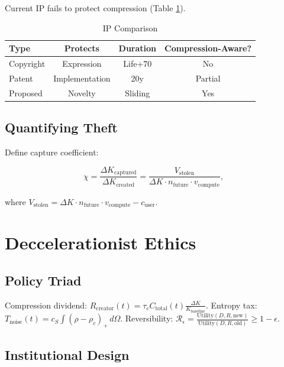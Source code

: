 \documentclass[12pt]{article}
\begin{document}
Current IP fails to protect compression (Table \ref{tab:ip}).

\begin{table}[h]
\caption{IP Comparison}
\begin{center}
\begin{tabular}{lccc}
\toprule
\textbf{Type} & \textbf{Protects} & \textbf{Duration} & \textbf{Compression-Aware?} \\
\midrule
Copyright & Expression & Life+70 & No \\
Patent & Implementation & 20y & Partial \\
Proposed & Novelty & Sliding & Yes \\
\bottomrule
\end{tabular}
\end{center}
\label{tab:ip}
\end{table}

\subsection{Quantifying Theft}

Define capture coefficient:

\[
\chi = \frac{\Delta K_{\text{captured}}}{\Delta K_{\text{created}}} = \frac{V_{\text{stolen}}}{\Delta K \cdot n_{\text{future}} \cdot v_{\text{compute}}},
\]

where \( V_{\text{stolen}} = \Delta K \cdot n_{\text{future}} \cdot v_{\text{compute}} - c_{\text{user}} \).

\section{Deccelerationist Ethics}

\subsection{Policy Triad}

Compression dividend: \( R_{\text{creator}}(t) = \tau_c C_{\text{total}}(t) \frac{\Delta K}{K_{\text{baseline}}} \). Entropy tax: \( T_{\text{noise}}(t) = c_S \int (\rho - \rho_c)_+ \, d\Omega \). Reversibility: \(\mathcal{R}_\epsilon = \frac{\text{Utility}(D, R, \text{new})}{\text{Utility}(D, R, \text{old})} \geq 1 - \epsilon\).

\subsection{Institutional Design}
\end{document}

